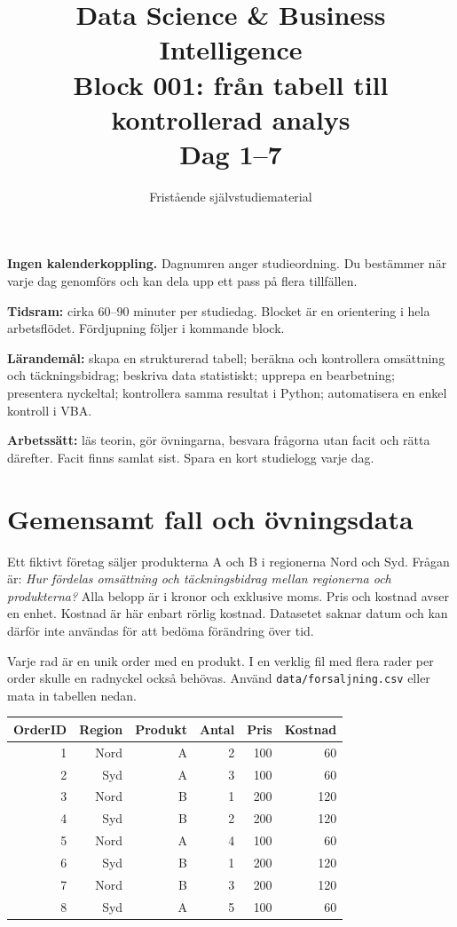 \documentclass[11pt,a4paper]{article}
\title{Data Science \& Business Intelligence\\\large Block 001: från tabell till kontrollerad analys\\Dag 1--7}
\author{Fristående självstudiematerial}
\date{}
\begin{document}
\maketitle
\textbf{Ingen kalenderkoppling.} Dagnumren anger studieordning. Du bestämmer när varje dag genomförs och kan dela upp ett pass på flera tillfällen.

\textbf{Tidsram:} cirka 60--90 minuter per studiedag. Blocket är en orientering i hela arbetsflödet. Fördjupning följer i kommande block.

\textbf{Lärandemål:} skapa en strukturerad tabell; beräkna och kontrollera omsättning och täckningsbidrag; beskriva data statistiskt; upprepa en bearbetning; presentera nyckeltal; kontrollera samma resultat i Python; automatisera en enkel kontroll i VBA.

\textbf{Arbetssätt:} läs teorin, gör övningarna, besvara frågorna utan facit och rätta därefter. Facit finns samlat sist. Spara en kort studielogg varje dag.
\tableofcontents

\section{Gemensamt fall och övningsdata}
Ett fiktivt företag säljer produkterna A och B i regionerna Nord och Syd. Frågan är: \emph{Hur fördelas omsättning och täckningsbidrag mellan regionerna och produkterna?} Alla belopp är i kronor och exklusive moms. Pris och kostnad avser en enhet. Kostnad är här enbart rörlig kostnad. Datasetet saknar datum och kan därför inte användas för att bedöma förändring över tid.

Varje rad är en unik order med en produkt. I en verklig fil med flera rader per order skulle en radnyckel också behövas. Använd \texttt{data/forsaljning.csv} eller mata in tabellen nedan.
\begin{center}
\begin{tabular}{rrrrrr}
\toprule
OrderID & Region & Produkt & Antal & Pris & Kostnad\\
\midrule
1 & Nord & A & 2 & 100 & 60\\
2 & Syd & A & 3 & 100 & 60\\
3 & Nord & B & 1 & 200 & 120\\
4 & Syd & B & 2 & 200 & 120\\
5 & Nord & A & 4 & 100 & 60\\
6 & Syd & B & 1 & 200 & 120\\
7 & Nord & B & 3 & 200 & 120\\
8 & Syd & A & 5 & 100 & 60\\
\bottomrule
\end{tabular}
\end{center}
\end{document}
